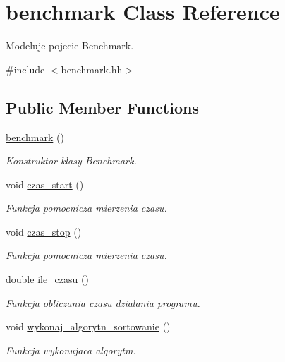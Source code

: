 \hypertarget{classbenchmark}{\section{benchmark Class Reference}
\label{classbenchmark}
}


Modeluje pojecie Benchmark.  




{\ttfamily \#include $<$benchmark.\-hh$>$}

\subsection*{Public Member Functions}
\begin{DoxyCompactItemize}
\item 
\hyperlink{classbenchmark_af56f1d9420c5c1ccc65e4f6aac54658d}{benchmark} ()
\begin{DoxyCompactList}\small\item\em Konstruktor klasy Benchmark. \end{DoxyCompactList}\item 
void \hyperlink{classbenchmark_a42ab532c49030406366e859f9b3f29f8}{czas\-\_\-start} ()
\begin{DoxyCompactList}\small\item\em Funkcja pomocnicza mierzenia czasu. \end{DoxyCompactList}\item 
void \hyperlink{classbenchmark_a9beb25d3e65b94c1ac7c085d8105fe65}{czas\-\_\-stop} ()
\begin{DoxyCompactList}\small\item\em Funkcja pomocnicza mierzenia czasu. \end{DoxyCompactList}\item 
double \hyperlink{classbenchmark_a613a8792feca7c2622355922d64d6fcd}{ile\-\_\-czasu} ()
\begin{DoxyCompactList}\small\item\em Funkcja obliczania czasu dzialania programu. \end{DoxyCompactList}\item 
void \hyperlink{classbenchmark_a845da6947383df74d871e273bf225721}{wykonaj\-\_\-algorytn\-\_\-sortowanie} ()
\begin{DoxyCompactList}\small\item\em Funkcja wykonujaca algorytm. \end{DoxyCompactList}\end{DoxyCompactItemize}
